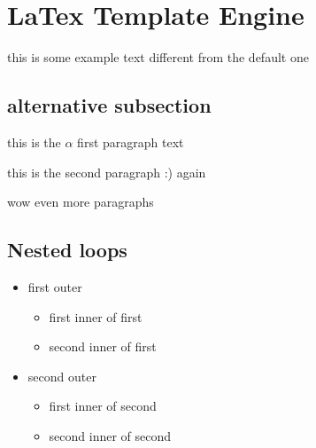 \documentclass[12pt]{article}
\begin{document}
\section{LaTex Template Engine}

this is some example text different from the default one

\subsection{alternative subsection}
this is the  $\alpha$ first paragraph text

this is the second paragraph :) again

wow even more paragraphs


\subsection{Nested loops}

\begin{itemize}
	\item first outer
	      \begin{itemize}
		      \item first inner of first
		      \item second inner of first
	      \end{itemize}
	\item second outer
	      \begin{itemize}
		      \item first inner of second
		      \item second inner of second
	      \end{itemize}
\end{itemize}
\end{document}
